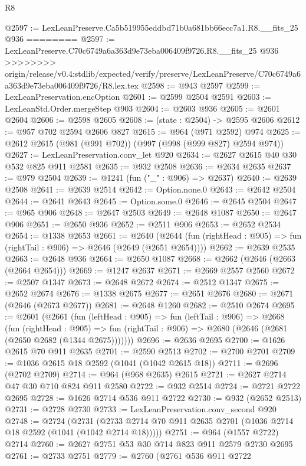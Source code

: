 \begin{lexlean}{R8}
\begin{coremodule}
{{{{{{{{{{{{{{{{{{{{{{{{{{{{{{{{{{{{{{{{{{{{{@2597 := LexLeanPreserve.Ca5b519955eddbd71b0a681bb66ecc7a1.R8.__fits_25 @936
========
@2597 := LexLeanPreserve.C70c6749a6a363d9e73eba006409f9726.R8.__fits_25 @936
>>>>>>>> origin/release/v0.4:stdlib/expected/verify/preserve/LexLeanPreserve/C70c6749a6a363d9e73eba006409f9726/R8.lex.tex
@2598 := @943 @2597
@2599 := LexLeanPreservation.encOption
@2601 := @2599 @2504 @2591
@2603 := LexLeanStd.Order.mergeStep @903
@2604 := @2603 @936
@2605 := @2601 @2604
@2606 := @2598 @2605
@2608 := (state : @2504) -> @2595 @2606
@2612 := @957 @702 @2594 @2606 @827
@2615 := @964 (@971 @2592) @974
@2625 := @2612 @2615 (@981 (@991 @702)) (@997 (@998 (@999 @827) @2594 @974))
@2627 := LexLeanPreservation.conv_let @920
@2634 := @2627 @2615 @40 @30 @532 @825 @911 @2581
@2635 := @932 @2508
@2636 := @2634 @2635
@2637 := @979 @2504
@2639 := @1241 (fun ("_" : @906) => @2637)
@2640 := @2639 @2508
@2641 := @2639 @2514
@2642 := Option.none.{0}
@2643 := @2642 @2504
@2644 := @2641 @2643
@2645 := Option.some.{0}
@2646 := @2645 @2504
@2647 := @965 @906
@2648 := @2647 @2503
@2649 := @2648 @1087
@2650 := @2647 @906
@2651 := @2650 @936
@2652 := @2511 @906
@2653 := @2652 @2534
@2654 := @1338 @2653
@2661 := @2640
    (@2644 (fun (rightHead : @905) => fun (rightTail : @906) => @2646 (@2649 (@2651 @2654))))
@2662 := @2639 @2535
@2663 := @2648 @936
@2664 := @2650 @1087
@2668 := @2662 (@2646 (@2663 (@2664 @2654)))
@2669 := @1247 @2637
@2671 := @2669 @2557 @2560
@2672 := @2507 @1347
@2673 := @2648 @2672
@2674 := @2512 @1347
@2675 := @2652 @2674
@2676 := @1338 @2675
@2677 := @2651 @2676
@2680 := @2671 (@2646 (@2673 @2677))
@2681 := @2648 @1260
@2682 := @2510 @2674
@2695 := @2601
    (@2661
      (fun (leftHead : @905) =>
      fun (leftTail : @906) =>
      @2668
        (fun (rightHead : @905) =>
        fun (rightTail : @906) => @2680 (@2646 (@2681 (@2650 @2682 (@1344 @2675)))))))
@2696 := @2636 @2695
@2700 := @1626 @2615 @70 @911 @2635
@2701 := @2590 @2513
@2702 := @2700 @2701
@2709 := @1036 @2615 @18 @2592 (@1041 (@1042 @2615 @18))
@2711 := @2696 (@2702 @2709)
@2714 := @964 (@968 @2635) @2615
@2721 := @2627 @2714 @47 @30 @710 @824 @911 @2580
@2722 := @932 @2514
@2724 := @2721 @2722 @2695
@2728 := @1626 @2714 @536 @911 @2722
@2730 := @932 (@2652 @2513)
@2731 := @2728 @2730
@2733 := LexLeanPreservation.conv_second @920
@2748 := @2724
    (@2731 (@2733 @2714 @70 @911 @2635 @2701 (@1036 @2714 @18 @2592 (@1041 (@1042 @2714 @18)))))
@2751 := @964 (@1557 @2722) @2714
@2760 := @2627 @2751 @53 @30 @714 @823 @911 @2579 @2730 @2695
@2761 := @2733 @2751
@2779 := @2760
    (@2761
      @536
      @911
      @2722
}}}}}}}}}}}}}}}}}}}}}}}}}}}}}}}}}}}}}}}}}}}}}
\end{coremodule}
\end{lexlean}
